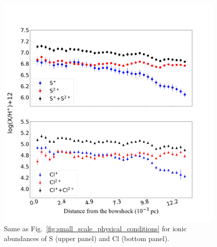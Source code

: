 \documentclass[twocolumn,linenumbers]{aastex63}
\newcommand{\cesar}[1]{{\color{red}C: #1}}
\begin{document}

\begin{figure}
\centering
\includegraphics[width=\columnwidth]{cl_s_abundances.pdf}
\caption{Same as Fig.~\ref{fig:small_scale_physical_conditions} for ionic abundances of S (upper panel) and Cl (bottom panel). }
\label{fig:cl_s_abundances}
\end{figure}
\end{document}
